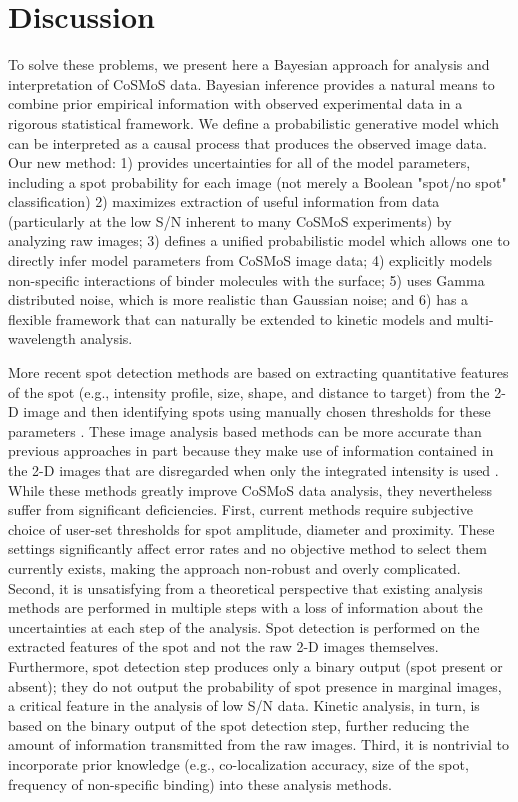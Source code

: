 \section*{Discussion}

To solve these problems, we present here a Bayesian approach for analysis and interpretation of CoSMoS data. Bayesian inference provides a natural means to combine prior empirical information with observed experimental data in a rigorous statistical framework. We define a probabilistic generative model which can be interpreted as a causal process that produces the observed image data.  Our new method: 1) provides uncertainties for all of the model parameters, including a spot probability for each image (not merely a Boolean "spot/no spot" classification) 2) maximizes extraction of useful information from data (particularly at the low S/N inherent to many CoSMoS experiments) by analyzing raw images; 3) defines a unified probabilistic model which allows one to directly infer model parameters from CoSMoS image data; 4) explicitly models non-specific interactions of binder molecules with the surface; 5) uses Gamma distributed noise, which is more realistic than Gaussian noise; and 6) has a flexible framework that can naturally be extended to kinetic models and multi-wavelength analysis. 

More recent spot detection methods are based on extracting quantitative features of the spot (e.g., intensity profile, size, shape, and distance to target) from the 2-D image and then identifying spots using manually chosen thresholds for these parameters \cite{Friedman2015-nx, Smith2019-yb}. These image analysis based methods can be more accurate than previous approaches in part because they make use of information contained in the 2-D images that are disregarded when only the integrated intensity is used \cite{Friedman2015-nx}. While these methods greatly improve CoSMoS data analysis, they nevertheless suffer from significant deficiencies. First, current methods require subjective choice of user-set thresholds for spot amplitude, diameter and proximity. These settings significantly affect error rates and no objective method to select them currently exists, making the approach non-robust and overly complicated. Second, it is unsatisfying from a theoretical perspective that existing analysis methods are performed in multiple steps with a loss of information about the uncertainties at each step of the analysis. Spot detection is performed on the extracted features of the spot and not the raw 2-D images themselves. Furthermore, spot detection step produces only a binary output (spot present or absent); they do not output the probability of spot presence in marginal images, a critical feature in the analysis of low S/N data. Kinetic analysis, in turn, is based on the binary output of the spot detection step, further reducing the amount of information transmitted from the raw images. Third, it is nontrivial to incorporate prior knowledge (e.g., co-localization accuracy, size of the spot, frequency of non-specific binding) into these analysis methods.


